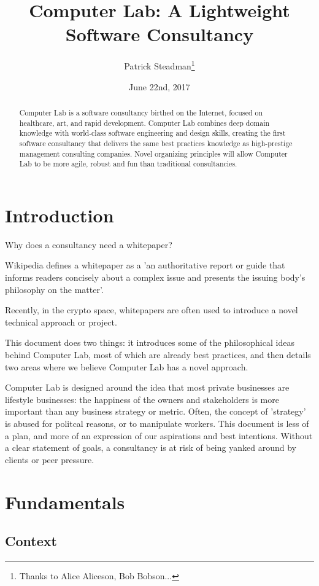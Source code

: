 \documentclass[12pt]{article}
\title{Computer Lab: A Lightweight Software Consultancy}
\author{Patrick Steadman\thanks{Thanks to Alice Aliceson, Bob Bobson...}}
\date{June 22nd, 2017}
\begin{document}
\maketitle

\begin{abstract}

Computer Lab is a software consultancy birthed on the Internet, focused on
healthcare, art, and rapid development. Computer Lab combines deep domain
knowledge with world-class software engineering and design skills, creating the
first software consultancy that delivers the same best practices knowledge as
high-prestige management consulting companies. Novel organizing principles will
allow Computer Lab to be more agile, robust and fun than traditional
consultancies.

\end{abstract}

\section{Introduction}

Why does a consultancy need a whitepaper?

Wikipedia defines a whitepaper as a 'an authoritative report or guide that
informs readers concisely about a complex issue and presents the issuing body's
philosophy on the matter'.

Recently, in the crypto space, whitepapers are often used to introduce a novel
technical approach or project.

This document does two things: it introduces some of the philosophical ideas
behind Computer Lab, most of which are already best practices, and then details
two areas where we believe Computer Lab has a novel approach.

Computer Lab is designed around the idea that most private businesses are
lifestyle businesses: the happiness of the owners and stakeholders is more
important than any business strategy or metric.  Often, the concept of
'strategy' is abused for politcal reasons, or to manipulate workers.  This
document is less of a plan, and more of an expression of our aspirations and
best intentions.  Without a clear statement of goals, a consultancy is at risk
of being yanked around by clients or peer pressure.

\section{Fundamentals}
\subsection{Context}
\end{document}
